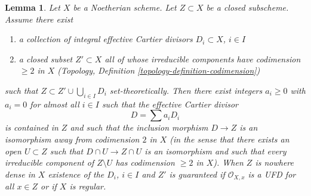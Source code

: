 \documentclass[10pt,a4paper]{amsart}
\theoremstyle{plain}
\newtheorem{lemma}[subsection]{Lemma}
\theoremstyle{definition}
\theoremstyle{remark}
\numberwithin{equation}{subsection}
\begin{document}
\begin{lemma}
\label{lemma-codim-1-part}
Let $X$ be a Noetherian scheme. Let $Z \subset X$ be a closed subscheme.
Assume there exist
\begin{enumerate}
\item a collection of integral effective Cartier divisors
$D_i \subset X$, $i \in I$
\item a closed subset $Z' \subset X$ all of whose irreducible components
have codimension $\geq 2$ in $X$
(Topology, Definition \ref{topology-definition-codimension})
\end{enumerate}
such that $Z \subset Z' \cup \bigcup_{i \in I} D_i$ set-theoretically.
Then there exist integers $a_i \geq 0$ with $a_i = 0$ for almost all $i \in I$
such that the effective Cartier divisor
$$
D = \sum a_i D_i
$$
is contained in $Z$ and such that the inclusion morphism $D \to Z$
is an isomorphism away from codimension $2$ in $X$
(in the sense that there exists an open $U \subset Z$ such that
$D \cap U \to Z \cap U$ is an isomorphism and such that every
irreducible component of $Z \setminus U$ has codimension $\geq 2$ in $X$).
When $Z$ is nowhere dense in $X$ existence of the $D_i$, $i \in I$ and $Z'$
is guaranteed if $\mathcal{O}_{X, x}$ is a UFD for all $x \in Z$
or if $X$ is regular.
\end{lemma}
\end{document}
